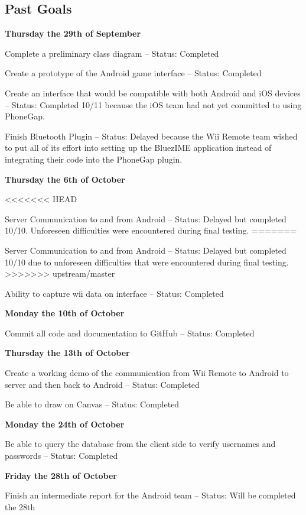 \documentclass[12pt]{article}
\newenvironment{itemize*}%
  {\begin{itemize}%
  	\setlength{\parsep}{0pt}
    \setlength{\itemsep}{0pt}%
    \setlength{\parskip}{0pt}}%
  {\end{itemize}}
\begin{document}
\begin{itemize*}
\subsection{Past Goals}
\textbf{Thursday the 29th of September}
\begin{itemize*}
\item Complete a preliminary class diagram – Status: Completed
\item Create a prototype of the Android game interface – Status: Completed
\item Create an interface that would be compatible with both Android and iOS devices – Status: Completed 10/11 because the iOS team had not yet committed to using PhoneGap.
\item Finish Bluetooth Plugin – Status: Delayed because the Wii Remote team wished to put all of its effort into setting up the BluezIME application instead of integrating their code into the PhoneGap plugin. 
\end{itemize*}
\textbf{Thursday the 6th of October}
\begin{itemize*}
<<<<<<< HEAD
\item Server Communication to and from Android – Status: Delayed but completed 10/10.  Unforeseen difficulties were encountered during final testing.
=======
\item Server Communication to and from Android – Status: Delayed but completed 10/10 due to unforeseen difficulties that were encountered during final testing.
>>>>>>> upstream/master
\item Ability to capture wii data on interface – Status: Completed
\end{itemize*}
\textbf{Monday the 10th of October}
\begin{itemize*}
\item Commit all code and documentation to GitHub – Status: Completed
\end{itemize*}
\textbf{Thursday the 13th of October}
\begin{itemize*}
\item Create a working demo of the communication from Wii Remote to Android to server and then back to Android – Status: Completed
\item Be able to draw on Canvas – Status: Completed
\end{itemize*}
\textbf{Monday the 24th of October}
\begin{itemize*}
\item Be able to query the database from the client side to verify usernames and passwords – Status: Completed
\end{itemize*}
\textbf{Friday the 28th of October}
\begin{itemize*}
\item Finish an intermediate report for the Android team – Status: Will be completed the 28th
\end{itemize*}



\end{itemize*}
\end{document}
